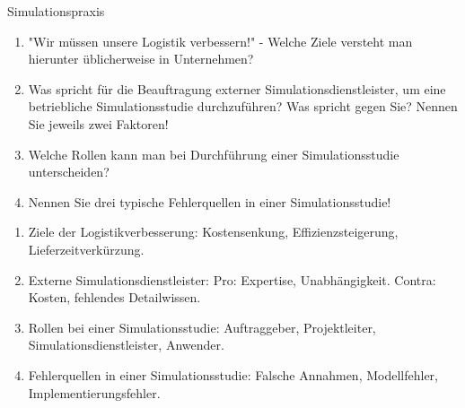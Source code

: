 \documentclass{article}
\begin{document}
\begin{exercise}{Simulationspraxis}
  \begin{enumerate}
    \item "Wir müssen unsere Logistik verbessern!" - Welche Ziele versteht man hierunter üblicherweise in Unternehmen?
    \item Was spricht für die Beauftragung externer Simulationsdienstleister, um eine betriebliche Simulationsstudie durchzuführen? Was spricht gegen Sie? Nennen Sie jeweils zwei Faktoren!
    \item Welche Rollen kann man bei Durchführung einer Simulationsstudie unterscheiden?
    \item Nennen Sie drei typische Fehlerquellen in einer Simulationsstudie!
  \end{enumerate}

  \begin{solution}
    \begin{enumerate}
      \item Ziele der Logistikverbesserung: Kostensenkung, Effizienzsteigerung, Lieferzeitverkürzung.
      \item Externe Simulationsdienstleister: Pro: Expertise, Unabhängigkeit. Contra: Kosten, fehlendes Detailwissen.
      \item Rollen bei einer Simulationsstudie: Auftraggeber, Projektleiter, Simulationsdienstleister, Anwender.
      \item Fehlerquellen in einer Simulationsstudie: Falsche Annahmen, Modellfehler, Implementierungsfehler.
    \end{enumerate}
  \end{solution}
\end{exercise}
\end{document}
